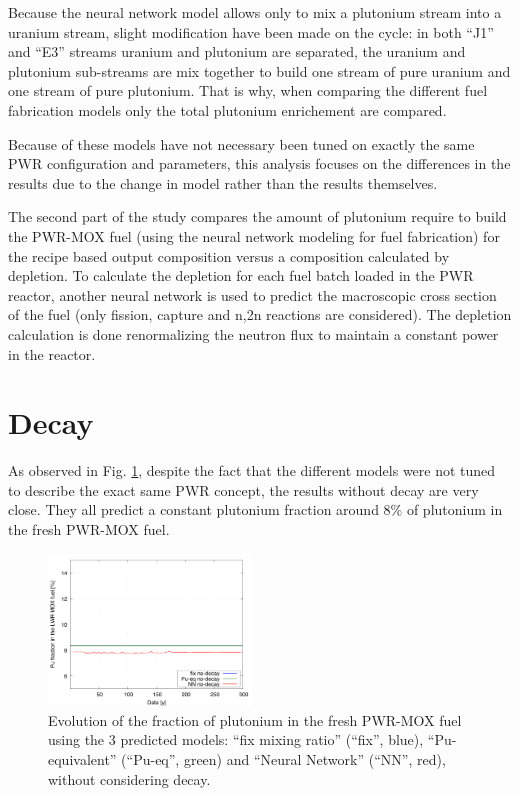 \documentclass{anstrans}
\begin{document}
Because the neural network model allows only to mix a plutonium stream into a
uranium stream, slight modification have been made on the cycle: in both ``J1''
and ``E3'' streams uranium and plutonium are separated, the uranium and
plutonium sub-streams are mix together to build one stream of pure uranium and
one stream of pure plutonium. That is why, when comparing the different fuel
fabrication models only the total plutonium enrichement are compared. 

Because of these models have not necessary been tuned on exactly the same
PWR configuration and parameters, this analysis focuses on the differences
in the results due to the change in model rather than the results themselves.

The second part of the study compares the amount of plutonium require to build
the PWR-MOX fuel (using the neural network modeling for fuel fabrication) for
the recipe based output composition versus a composition calculated by
depletion.  To calculate the depletion for each fuel batch loaded in the PWR
reactor, another neural network is used to predict the macroscopic cross section
of the fuel \cite{Leniau2015125} (only fission, capture and n,2n reactions are
considered). The depletion calculation is done renormalizing the neutron flux to
maintain a constant power in the reactor.

\section{Decay}


As observed in Fig. \ref{fig:nod}, despite the fact that the different models
were not tuned to describe the exact same PWR concept, the results without decay
are very close. They all predict a constant plutonium fraction around $8\%$ of
plutonium in the fresh PWR-MOX fuel.

\begin{figure}[ht] %
  \centering
  \includegraphics[width=0.48\textwidth]{nodecay_pu_contribution.png}
  \caption{Evolution of the fraction of plutonium in the fresh PWR-MOX fuel
  using the 3 predicted models: ``fix mixing ratio'' (``fix'', blue), ``Pu-equivalent''
  (``Pu-eq'', green) and ``Neural Network'' (``NN'', red), without considering decay.}
  \label{fig:nod}
\end{figure}
\end{document}
